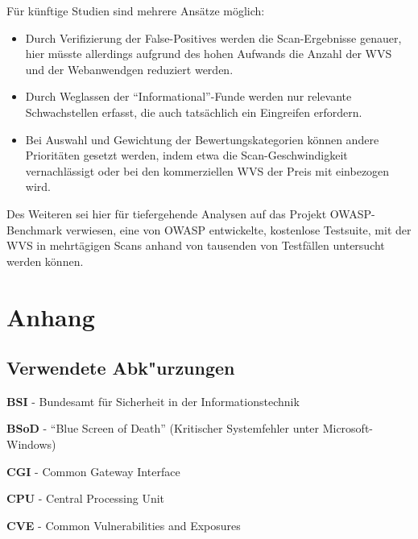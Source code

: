 \documentclass[12pt,oneside,a4paper,parskip]{scrbook}
\begin{document}
Für künftige Studien sind mehrere Ansätze möglich:
\begin{itemize}
  \item Durch Verifizierung der False-Positives werden die Scan-Ergebnisse genauer, hier müsste allerdings aufgrund des hohen Aufwands die Anzahl der WVS und der Webanwendgen reduziert werden.
  \item Durch Weglassen der ``Informational''-Funde werden nur relevante Schwachstellen erfasst, die auch tatsächlich ein Eingreifen erfordern.
  \item Bei Auswahl und Gewichtung der Bewertungskategorien können andere Prioritäten gesetzt werden, indem etwa die Scan-Geschwindigkeit vernachlässigt oder bei den kommerziellen WVS der Preis mit einbezogen wird.
\end{itemize}
Des Weiteren sei hier für tiefergehende Analysen auf das Projekt OWASP-Benchmark \cite{OWASPbench} verwiesen, eine von OWASP entwickelte, kostenlose Testsuite, mit der WVS in mehrtägigen Scans anhand von tausenden von Testfällen untersucht werden können.




\backmatter



\cleardoublepage
{}
{}
\printbibliography[title=Quellenverzeichnis]

\appendix
  \chapter{Anhang}


  \section{Verwendete Abk"urzungen}
  \textbf{BSI} - Bundesamt für Sicherheit in der Informationstechnik

  \textbf{BSoD} - ``Blue Screen of Death'' (Kritischer Systemfehler unter Microsoft-Windows)

  \textbf{CGI} - Common Gateway Interface

  \textbf{CPU} - Central Processing Unit

  \textbf{CVE} - Common Vulnerabilities and Exposures
\end{document}
